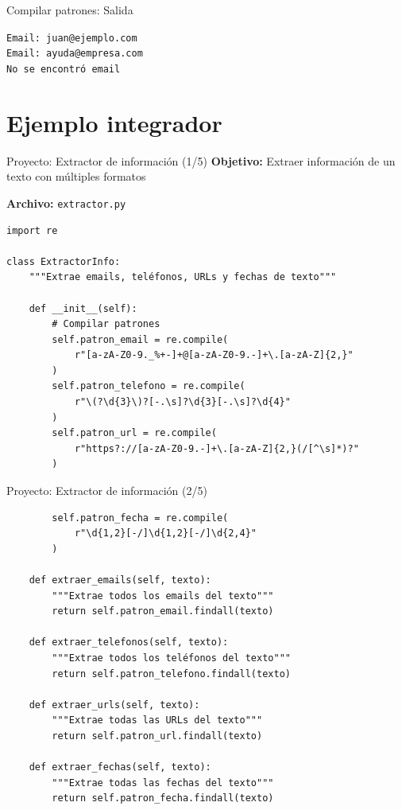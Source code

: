 \documentclass{beamer}
\begin{document}
\begin{frame}[fragile]{Compilar patrones: Salida \faArrowCircleRight}
\begin{tcolorbox}[colback=green!10,colframe=green,title={\small\faArrowCircleRight \ Salida},coltitle=fg0,left=3pt,right=3pt,top=3pt,bottom=3pt,boxsep=2pt]
\small\texttt{Email: juan@ejemplo.com\\
Email: ayuda@empresa.com\\
No se encontró email}
\end{tcolorbox}
\end{frame}

\section{Ejemplo integrador}

\begin{frame}[fragile]{Proyecto: Extractor de información (1/5) \faFileAlt}
\textbf{Objetivo:} Extraer información de un texto con múltiples formatos

\vspace{0.2cm}
\textbf{Archivo:} \texttt{extractor.py}
\begin{lstlisting}
import re

class ExtractorInfo:
    """Extrae emails, teléfonos, URLs y fechas de texto"""
    
    def __init__(self):
        # Compilar patrones
        self.patron_email = re.compile(
            r"[a-zA-Z0-9._%+-]+@[a-zA-Z0-9.-]+\.[a-zA-Z]{2,}"
        )
        self.patron_telefono = re.compile(
            r"\(?\d{3}\)?[-.\s]?\d{3}[-.\s]?\d{4}"
        )
        self.patron_url = re.compile(
            r"https?://[a-zA-Z0-9.-]+\.[a-zA-Z]{2,}(/[^\s]*)?"
        )
\end{lstlisting}
\end{frame}

\begin{frame}[fragile]{Proyecto: Extractor de información (2/5) \faCode}
\begin{lstlisting}
        self.patron_fecha = re.compile(
            r"\d{1,2}[-/]\d{1,2}[-/]\d{2,4}"
        )
    
    def extraer_emails(self, texto):
        """Extrae todos los emails del texto"""
        return self.patron_email.findall(texto)
    
    def extraer_telefonos(self, texto):
        """Extrae todos los teléfonos del texto"""
        return self.patron_telefono.findall(texto)
    
    def extraer_urls(self, texto):
        """Extrae todas las URLs del texto"""
        return self.patron_url.findall(texto)
    
    def extraer_fechas(self, texto):
        """Extrae todas las fechas del texto"""
        return self.patron_fecha.findall(texto)
\end{lstlisting}
\end{frame}
\end{document}
